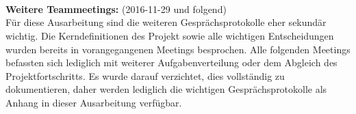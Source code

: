 \\
\\
\\
\textbf{Weitere Teammeetings:} (2016-11-29 und folgend)\\
Für diese Ausarbeitung sind die weiteren Gesprächsprotokolle eher sekundär wichtig. Die Kerndefinitionen des Projekt sowie alle wichtigen Entscheidungen wurden bereits in vorangegangenen Meetings besprochen. Alle folgenden Meetings befassten sich lediglich mit weiterer Aufgabenverteilung oder dem Abgleich des Projektfortschritts.
Es wurde darauf verzichtet, dies vollständig zu dokumentieren, daher werden lediglich die wichtigen Gesprächsprotokolle als Anhang in dieser Ausarbeitung verfügbar.
